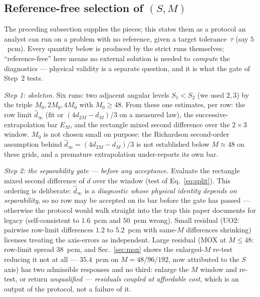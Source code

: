 \documentclass[11pt,a4paper]{article}
\begin{document}
\subsection{Reference-free selection of $(S,M)$}
\label{sec:protocol}
The preceding subsection supplies the pieces; this states them as a
protocol an analyst can run on a problem with no reference,
given a target tolerance~$\tau$ (say $5$~pcm).  Every quantity below
is produced by the strict runs themselves; ``reference-free'' here
means no external solution is needed to \emph{compute} the
diagnostics --- physical validity is a separate question, and it is
what the gate of Step~2 tests.

\emph{Step 1: skeleton.}  Six runs: two adjacent angular levels
$S_1<S_2$ (we used $2,3$) by the triple $M_0,2M_0,4M_0$ with
$M_0\ge48$.  From these one estimates, per row: the row limit
$\hat d_\infty$ (fit or $(4d_{2M}-d_M)/3$ on a measured law), the
successive-extrapolation bar $E_M$, and the rectangle mixed second
difference over the $2{\times}3$ window.  $M_0$ is not chosen small
on purpose: the Richardson second-order assumption behind
$\hat d_\infty=(4d_{2M}-d_M)/3$ is not established below
$M\approx48$ on these grids, and a premature extrapolation
under-reports its own bar.

\emph{Step 2: the separability gate --- before any acceptance.}
Evaluate the rectangle mixed second difference of $d$ over the
window (test of Eq.~\eqref{eq:split}).  This ordering is deliberate:
$\hat d_\infty$ is a \emph{diagnostic whose physical identity depends
on separability}, so no row may be accepted on its bar before the
gate has passed --- otherwise the protocol would walk straight into
the trap this paper documents for legacy (self-consistent to
$1.6$~pcm and $50$~pcm wrong).  Small residual (UO2: pairwise
row-limit differences $1.2$ to $5.2$~pcm with same-$M$ differences
shrinking) licenses treating the axis-errors as independent.  Large
residual (MOX at $M\le48$: row-limit spread $38$~pcm, and Sec.~\ref{sec:mox}
shows the enlarged-$M$ re-test reducing it not at all --- $35.4$~pcm
on $M=48/96/192$, now attributed to the $S$ axis) has two admissible responses
and no third: enlarge the $M$ window and re-test, or return
\emph{unqualified --- residuals coupled at affordable cost}, which is
an output of the protocol, not a failure of it.
\end{document}
